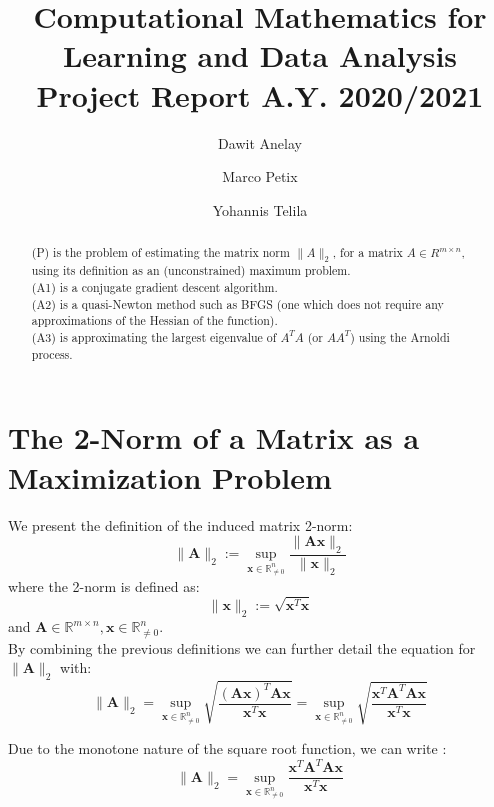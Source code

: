 \documentclass{article}
\title{Computational Mathematics for Learning and Data Analysis Project Report  A.Y. 2020/2021}
\author{Dawit Anelay}
\author{Marco Petix}
\author{Yohannis Telila}
\affil{Department of Computer science, University of Pisa, Pisa, Italy.}
\numberwithin{equation}{section}
\begin{document}
\newtheorem{theorem}{Theorem}
\newtheorem{proposition}[theorem]{Proposition}
\maketitle

\tableofcontents

\begin{abstract}
(P) is the problem of estimating the matrix norm $\|A\|_2$, for a matrix $A \in R^{m\times n}$, using its definition as an (unconstrained) maximum problem.\\
(A1) is a conjugate gradient descent algorithm.\\
(A2) is a quasi-Newton method such as BFGS (one which does not require any approximations of the Hessian of the function).\\
(A3) is approximating the largest eigenvalue of $A^TA$ (or $AA^T$) using the Arnoldi process.
\end{abstract}

\section{The 2-Norm of a Matrix as a Maximization Problem}
We present the definition of the induced matrix 2-norm: 
\begin{equation}
    \|\boldsymbol{A}\|_2:=\sup_{\boldsymbol{x} \in \mathbb{R}^n_{\not = 0}}\frac{\|\boldsymbol{A} \boldsymbol{x}\|_2 }{\|\boldsymbol{x}\|_2}
\end{equation}
where the 2-norm is defined as: 
\begin{equation}
    \|\boldsymbol{x} \|_2 := \sqrt{\boldsymbol{x}^T \boldsymbol{x}} 
\end{equation}
and $\boldsymbol{A} \in \mathbb{R}^{m \times n}, \boldsymbol{x} \in \mathbb{R}^{n}_{\not =0}$.\\

By combining the previous definitions we can further detail the equation for $\| \boldsymbol{A}\|_2$ with:
\begin{equation}
    \|\boldsymbol{A}\|_2=\sup_{\boldsymbol{x} \in \mathbb{R}^n_{\not = 0}} \sqrt{\frac{(\boldsymbol{Ax})^T \boldsymbol{Ax}}{\boldsymbol{x}^T \boldsymbol{x}}}=\sup_{\boldsymbol{x} \in \mathbb{R}^n_{\not = 0}}\sqrt{\frac{\boldsymbol{x}^T \boldsymbol{A}^T \boldsymbol{A} \boldsymbol{x}}{\boldsymbol{x}^T \boldsymbol{x}}}
\end{equation}

Due to the monotone nature of the square root function, we can write :
\begin{equation}
    \|\boldsymbol{A}\|_2= \sup_{\boldsymbol{x} \in \mathbb{R}^n_{\not = 0}}  \frac{\boldsymbol{x}^T \boldsymbol{A}^T \boldsymbol{A} \boldsymbol{x}}{\boldsymbol{x}^T \boldsymbol{x}} 
\end{equation}
\end{document}

